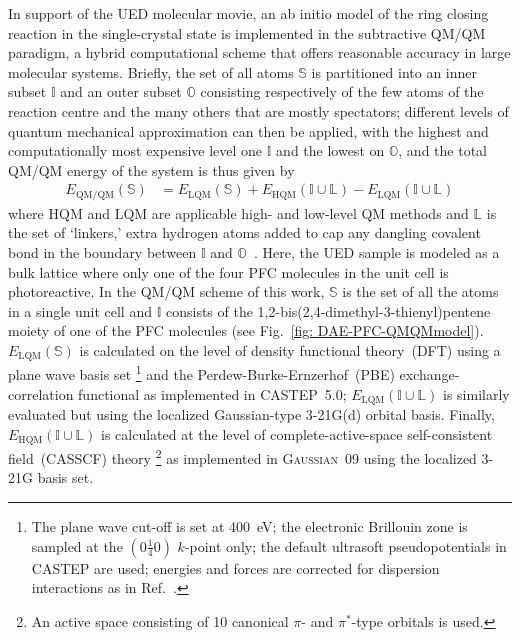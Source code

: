 In support of the UED molecular movie, an ab initio model of the ring closing reaction
in the single-crystal state is implemented in the subtractive QM/QM paradigm,
a hybrid computational scheme that offers reasonable accuracy in large molecular systems.
%
Briefly, the set of all atoms $\mathbb{S}$ is partitioned into an inner subset $\mathbb{I}$
and an outer subset $\mathbb{O}$ consisting respectively of the few atoms of the reaction centre
and the many others that are mostly spectators;
different levels of quantum mechanical approximation can then be applied,
with the highest and computationally most expensive level one $\mathbb{I}$ and the lowest on $\mathbb{O}$,
and the total QM/QM energy of the system is thus given by
%
\begin{equation}
  \begin{aligned}
    E_\mathrm{QM/QM}(\mathbb{S}) & = E_\mathrm{LQM}(\mathbb{S})
      + E_\mathrm{HQM}(\mathbb{I} \cup \mathbb{L}) - E_\mathrm{LQM}(\mathbb{I} \cup \mathbb{L})
  \end{aligned}
  \label{eqn: QMQM}
\end{equation}
%
where $\mathrm{HQM}$ and $\mathrm{LQM}$ are applicable high- and low-level QM methods and
$\mathbb{L}$ is the set of `linkers,' extra hydrogen atoms added to cap any dangling covalent bond
in the boundary between $\mathbb{I}$ and $\mathbb{O}$~\cite{Senn2006, Vreven2006, Kochman2013}.
%
Here, the UED sample is modeled as a bulk lattice where only one of the four PFC molecules
in the unit cell is photoreactive.
In the QM/QM scheme of this work, $\mathbb{S}$ is the set of all the atoms in a single unit cell
and $\mathbb{I}$ consists of the 1,2-bis(2,4-dimethyl-3-thienyl)pentene moiety
of one of the PFC molecules (see Fig.~\ref{fig: DAE-PFC-QMQMmodel}).
%
$E_\mathrm{LQM}(\mathbb{S})$ is calculated on the level of density functional theory~(DFT)
using a plane wave basis set%
\footnote{The plane wave cut-off is set at 400~eV;
the electronic Brillouin zone is sampled at the $(0 \frac{1}{4} 0)$ $k$-point only;
the default ultrasoft pseudopotentials in \textsc{CASTEP} are used;
energies and forces are corrected for dispersion interactions as in Ref.~\cite{Grimme2006}.}
and the Perdew-Burke-Ernzerhof~(PBE) exchange-correlation functional
as implemented in \textsc{CASTEP}~5.0;
%
$E_\mathrm{LQM}(\mathbb{I} \cup \mathbb{L})$ is similarly evaluated but
using the localized Gaussian-type 3-21G(d) orbital basis.
%
Finally, $E_\mathrm{HQM}(\mathbb{I} \cup \mathbb{L})$ is calculated at the level of
complete-active-space self-consistent field~(CASSCF) theory%
\footnote{An active space consisting of 10 canonical $\pi$- and $\pi^*$-type orbitals
is used.} as implemented in \textsc{Gaussian}~09 using the localized 3-21G basis set.

